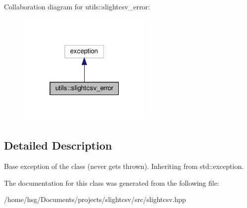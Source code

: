 Collaboration diagram for utils\+:\+:slightcsv\+\_\+error\+:
\nopagebreak
\begin{figure}[H]
\begin{center}
\leavevmode
\includegraphics[width=184pt]{classutils_1_1slightcsv__error__coll__graph}
\end{center}
\end{figure}


\subsection{Detailed Description}
Base exception of the class (never gets thrown). Inheriting from std\+::exception. 

The documentation for this class was generated from the following file\+:\begin{DoxyCompactItemize}
\item 
/home/hsg/\+Documents/projects/slightcsv/src/slightcsv.\+hpp\end{DoxyCompactItemize}
